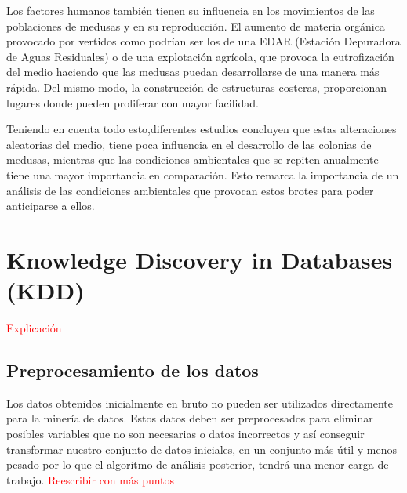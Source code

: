  \cite{canepa_environmental_2017}


Los factores humanos también tienen su influencia en los movimientos de las poblaciones de medusas y en su reproducción. 
El aumento de materia orgánica provocado por vertidos como podrían ser los de una EDAR (Estación Depuradora de Aguas Residuales) o de una explotación agrícola, que provoca la eutrofización del medio haciendo que las medusas puedan desarrollarse de una manera más rápida. Del mismo modo, la construcción de estructuras costeras, proporcionan lugares donde pueden proliferar con mayor facilidad.


Teniendo en cuenta todo esto,diferentes estudios concluyen que estas alteraciones aleatorias del medio, tiene poca influencia en el desarrollo de las colonias de medusas, mientras que las condiciones ambientales que se repiten anualmente tiene una mayor importancia en comparación. Esto remarca la importancia de un análisis de las condiciones ambientales que provocan estos brotes para poder anticiparse a ellos.\cite{art:ArticuloCanepa_1}

\section{Knowledge Discovery in Databases (KDD)}
\textcolor{red}{Explicación}
\subsection{Preprocesamiento de los datos}
Los datos obtenidos inicialmente en bruto no pueden ser utilizados directamente para la minería de datos. Estos datos deben ser preprocesados para eliminar posibles variables que no son necesarias o datos incorrectos y así conseguir transformar nuestro conjunto de datos iniciales, en un conjunto más útil y menos pesado por lo que el algoritmo de análisis posterior, tendrá una menor carga de trabajo. 
\textcolor{red}{Reescribir con más puntos}
